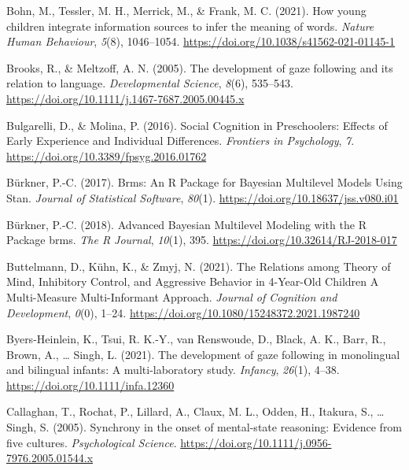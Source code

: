 \documentclass[
  man,floatsintext]{apa6}
\newlength{\cslhangindent}
\newlength{\cslentryspacingunit} %
\newenvironment{CSLReferences}[2] %
 {%
  \setlength{\parindent}{0pt}
  \ifodd #1
  \let\oldpar\par
  \def\par{\hangindent=\cslhangindent\oldpar}
  \fi
  \setlength{\parskip}{#2\cslentryspacingunit}
 }%
 {}
\begin{document}
\begin{CSLReferences}{1}{0}
\leavevmode{}%
Bohn, M., Tessler, M. H., Merrick, M., \& Frank, M. C. (2021). How young children integrate information sources to infer the meaning of words. \emph{Nature Human Behaviour}, \emph{5}(8), 1046--1054. \url{https://doi.org/10.1038/s41562-021-01145-1}

\leavevmode{}%
Brooks, R., \& Meltzoff, A. N. (2005). The development of gaze following and its relation to language. \emph{Developmental Science}, \emph{8}(6), 535--543. \url{https://doi.org/10.1111/j.1467-7687.2005.00445.x}

\leavevmode{}%
Bulgarelli, D., \& Molina, P. (2016). Social {Cognition} in {Preschoolers}: {Effects} of {Early Experience} and {Individual Differences}. \emph{Frontiers in Psychology}, \emph{7}. \url{https://doi.org/10.3389/fpsyg.2016.01762}

\leavevmode{}%
Bürkner, P.-C. (2017). Brms: {An R Package} for {Bayesian Multilevel Models Using Stan}. \emph{Journal of Statistical Software}, \emph{80}(1). \url{https://doi.org/10.18637/jss.v080.i01}

\leavevmode{}%
Bürkner, P.-C. (2018). Advanced {Bayesian Multilevel Modeling} with the {R Package} brms. \emph{The R Journal}, \emph{10}(1), 395. \url{https://doi.org/10.32614/RJ-2018-017}

\leavevmode{}%
Buttelmann, D., Kühn, K., \& Zmyj, N. (2021). The {Relations} among {Theory} of {Mind}, {Inhibitory Control}, and {Aggressive Behavior} in 4-{Year-Old Children} \textendash{} {A Multi-Measure Multi-Informant Approach}. \emph{Journal of Cognition and Development}, \emph{0}(0), 1--24. \url{https://doi.org/10.1080/15248372.2021.1987240}

\leavevmode{}%
Byers-Heinlein, K., Tsui, R. K.-Y., van Renswoude, D., Black, A. K., Barr, R., Brown, A., \ldots{} Singh, L. (2021). The development of gaze following in monolingual and bilingual infants: {A} multi-laboratory study. \emph{Infancy}, \emph{26}(1), 4--38. \url{https://doi.org/10.1111/infa.12360}

\leavevmode{}%
Callaghan, T., Rochat, P., Lillard, A., Claux, M. L., Odden, H., Itakura, S., \ldots{} Singh, S. (2005). Synchrony in the onset of mental-state reasoning: {Evidence} from five cultures. \emph{Psychological Science}. \url{https://doi.org/10.1111/j.0956-7976.2005.01544.x}


\end{CSLReferences}
\end{document}
